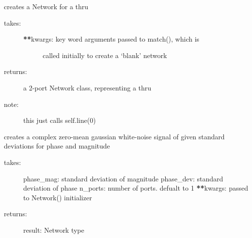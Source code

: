 \documentclass[letterpaper,10pt,english]{sphinxmanual}
\begin{document}
\begin{fulllineitems}
\begin{fulllineitems}
\label{api/mwavepy.media:mwavepy.media.media.Media.thru}
creates a Network for a thru
\begin{description}
\item[{takes:}] \leavevmode\begin{description}
\item[{{\color{red}\bfseries{}**}kwargs: key word arguments passed to match(), which is }] \leavevmode
called initially to create a `blank' network

\end{description}

\item[{returns:}] \leavevmode
a 2-port Network class, representing a thru

\item[{note:}] \leavevmode
this just calls self.line(0)

\end{description}

\end{fulllineitems}


\begin{fulllineitems}
\label{api/mwavepy.media:mwavepy.media.media.Media.white_gaussian_polar}
creates a complex zero-mean gaussian white-noise signal of given
standard deviations for phase and magnitude
\begin{description}
\item[{takes:}] \leavevmode
phase\_mag: standard deviation of magnitude
phase\_dev: standard deviation of phase
n\_ports: number of ports. defualt to 1
{\color{red}\bfseries{}**}kwargs: passed to Network() initializer

\item[{returns:}] \leavevmode
result: Network type

\end{description}

\end{fulllineitems}


\begin{fulllineitems}
\label{api/mwavepy.media:mwavepy.media.media.Media.z0}
\end{fulllineitems}


\end{fulllineitems}
\end{document}
